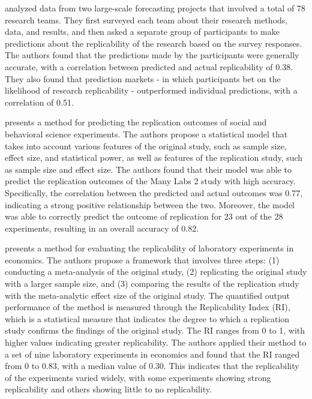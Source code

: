 \documentclass[12pt, a4paper, twocolumn]{article}
\begin{document}
			\citet{Gordon2021} analyzed data from two large-scale forecasting projects that involved a total of 78 research teams. They first surveyed each team about their research methods, data, and results, and then asked a separate group of participants to make predictions about the replicability of the research based on the survey responses. The authors found that the predictions made by the participants were generally accurate, with a correlation between predicted and actual replicability of 0.38. They also found that prediction markets - in which participants bet on the likelihood of research replicability - outperformed individual predictions, with a correlation of 0.51.

			\citet{Forsell2019} presents a method for predicting the replication outcomes of social and behavioral science experiments. The authors propose a statistical model that takes into account various features of the original study, such as sample size, effect size, and statistical power, as well as features of the replication study, such as sample size and effect size. The authors found that their model was able to predict the replication outcomes of the Many Labs 2 study with high accuracy. Specifically, the correlation between the predicted and actual outcomes was 0.77, indicating a strong positive relationship between the two. Moreover, the model was able to correctly predict the outcome of replication for 23 out of the 28 experiments, resulting in an overall accuracy of 0.82.

			\citet{Camerer2016evaluating} presents a method for evaluating the replicability of laboratory experiments in economics. The authors propose a framework that involves three steps: (1) conducting a meta-analysis of the original study, (2) replicating the original study with a larger sample size, and (3) comparing the results of the replication study with the meta-analytic effect size of the original study. The quantified output performance of the method is measured through the Replicability Index (RI), which is a statistical measure that indicates the degree to which a replication study confirms the findings of the original study. The RI ranges from 0 to 1, with higher values indicating greater replicability. The authors applied their method to a set of nine laboratory experiments in economics and found that the RI ranged from 0 to 0.83, with a median value of 0.30. This indicates that the replicability of the experiments varied widely, with some experiments showing strong replicability and others showing little to no replicability.
\end{document}
